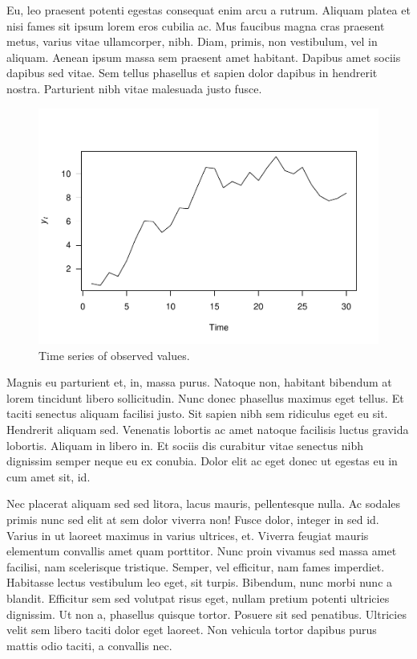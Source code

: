 \documentclass[11pt,]{report}
\begin{document}
Eu, leo praesent potenti egestas consequat enim arcu a rutrum. Aliquam
platea et nisi fames sit ipsum lorem eros cubilia ac. Mus faucibus magna
cras praesent metus, varius vitae ullamcorper, nibh. Diam, primis, non
vestibulum, vel in aliquam. Aenean ipsum massa sem praesent amet
habitant. Dapibus amet sociis dapibus sed vitae. Sem tellus phasellus et
sapien dolor dapibus in hendrerit nostra. Parturient nibh vitae
malesuada justo fusce.

\vspace{0.5in}

\begin{figure}
\centering
\includegraphics{hw_06_template_files/figure-latex/random_walk-1.pdf}
\caption{Time series of observed values.}
\end{figure}

Magnis eu parturient et, in, massa purus. Natoque non, habitant bibendum
at lorem tincidunt libero sollicitudin. Nunc donec phasellus maximus
eget tellus. Et taciti senectus aliquam facilisi justo. Sit sapien nibh
sem ridiculus eget eu sit. Hendrerit aliquam sed. Venenatis lobortis ac
amet natoque facilisis luctus gravida lobortis. Aliquam in libero in. Et
sociis dis curabitur vitae senectus nibh dignissim semper neque eu ex
conubia. Dolor elit ac eget donec ut egestas eu in cum amet sit, id.

Nec placerat aliquam sed sed litora, lacus mauris, pellentesque nulla.
Ac sodales primis nunc sed elit at sem dolor viverra non! Fusce dolor,
integer in sed id. Varius in ut laoreet maximus in varius ultrices, et.
Viverra feugiat mauris elementum convallis amet quam porttitor. Nunc
proin vivamus sed massa amet facilisi, nam scelerisque tristique.
Semper, vel efficitur, nam fames imperdiet. Habitasse lectus vestibulum
leo eget, sit turpis. Bibendum, nunc morbi nunc a blandit. Efficitur sem
sed volutpat risus eget, nullam pretium potenti ultricies dignissim. Ut
non a, phasellus quisque tortor. Posuere sit sed penatibus. Ultricies
velit sem libero taciti dolor eget laoreet. Non vehicula tortor dapibus
purus mattis odio taciti, a convallis nec.
\end{document}
